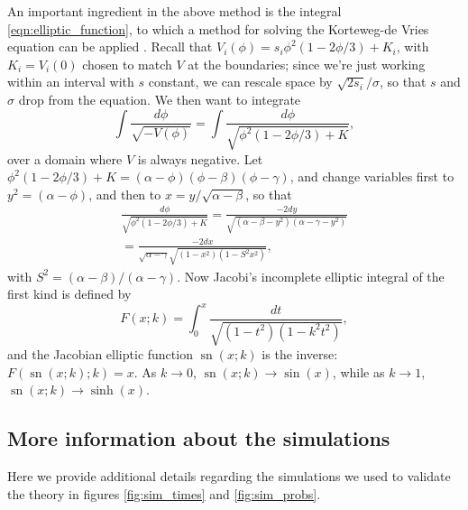 \documentclass{article}
\newcommand{\citep}[1]{\cite{#1}}
\DeclareMathOperator{\sn}{sn}
\begin{document}
An important ingredient in the above method is the integral \eqref{eqn:elliptic_function},
to which a method for solving the Korteweg-de Vries equation can be applied \citep{NEQwiki}.
Recall that $V_i(\phi) =  s_i \phi^2(1-2\phi/3) + K_i$, with $K_i = V_i(0)$ chosen to match $V$ at the boundaries;
since we're just working within an interval with $s$ constant, we can rescale space by $\sqrt{2 s_i}/\sigma$,
so that $s$ and $\sigma$ drop from the equation.
We then want to integrate
\[
    \int \frac{ d\phi }{ \sqrt{-V(\phi)} } = 
         \int \frac{ d\phi }{ \sqrt{ \phi^2 (1-2\phi/3) + K } } ,
\]
over a domain where $V$ is always negative.
Let $\phi^2(1-2\phi/3)+K = (\alpha-\phi)(\phi-\beta)(\phi-\gamma)$,
and change variables first to $y^2=(\alpha-\phi)$, 
and then to $x = y/\sqrt{\alpha-\beta}$, so that
\begin{align*}
    \frac{ d\phi }{ \sqrt{ \phi^2 (1-2\phi/3) + K } } 
        = \frac{ - 2 dy }{ \sqrt{ (\alpha-\beta-y^2) (\alpha-\gamma-y^2) } } \\
        = \frac{ - 2 dx }{ \sqrt{\alpha-\gamma} \sqrt{ (1-x^2) (1-S^2 x^2) } } ,
\end{align*}
with $S^2 = (\alpha-\beta)/(\alpha-\gamma)$.
Now Jacobi's incomplete elliptic integral of the first kind is defined by
\[
    F(x;k) = \int_0^x \frac{dt}{\sqrt{ (1-t^2)(1-k^2t^2) }} ,
\]
and the Jacobian elliptic function $\sn(x;k)$ is the inverse: $F(\sn(x;k);k) = x$.
As $k \to 0$, $\sn(x;k) \to \sin(x)$, while as $k \to 1$, $\sn(x;k) \to \sinh(x)$.




\subsection*{More information about the simulations}
\label{apx:parameter_tables}

Here we provide additional details regarding the simulations we used
to validate the theory in figures \ref{fig:sim_times} and \ref{fig:sim_probs}.
\end{document}
